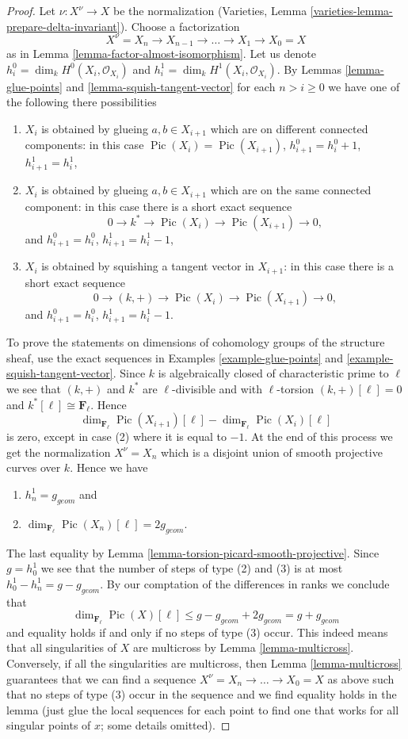 \documentclass[10pt,a4paper]{amsart}
\theoremstyle{plain}
\theoremstyle{definition}
\theoremstyle{remark}
\numberwithin{equation}{subsection}
\def\Pic{\mathop{\mathrm{Pic}}\nolimits}
\begin{document}
\begin{proof}
Let $\nu : X^\nu \to X$ be the normalization
(Varieties, Lemma \ref{varieties-lemma-prepare-delta-invariant}).
Choose a factorization
$$
X^\nu = X_n \to X_{n - 1} \to \ldots \to X_1 \to X_0 = X
$$
as in Lemma \ref{lemma-factor-almost-isomorphism}.
Let us denote $h^0_i = \dim_k H^0(X_i, \mathcal{O}_{X_i})$
and $h^1_i = \dim_k H^1(X_i, \mathcal{O}_{X_i})$.
By Lemmas \ref{lemma-glue-points} and \ref{lemma-squish-tangent-vector}
for each $n > i \geq 0$ we have
one of the following there possibilities
\begin{enumerate}
\item $X_i$ is obtained by glueing $a, b \in X_{i + 1}$
which are on different connected components: in this case
$\Pic(X_i) = \Pic(X_{i + 1})$,
$h^0_{i + 1} = h^0_i + 1$, $h^1_{i + 1} = h^1_i$,
\item $X_i$ is obtained by glueing $a, b \in X_{i + 1}$
which are on the same connected component: in this case
there is a short exact sequence
$$
0 \to k^* \to \Pic(X_i) \to \Pic(X_{i + 1}) \to 0,
$$
and $h^0_{i + 1} = h^0_i$, $h^1_{i + 1} = h^1_i - 1$,
\item $X_i$ is obtained by squishing a tangent vector in $X_{i + 1}$:
in this case there is a short exact sequence
$$
0 \to (k, +) \to \Pic(X_i) \to \Pic(X_{i + 1}) \to 0,
$$
and $h^0_{i + 1} = h^0_i$, $h^1_{i + 1} = h^1_i - 1$.
\end{enumerate}
To prove the statements on dimensions of cohomology groups of the
structure sheaf, use the exact sequences in
Examples \ref{example-glue-points} and \ref{example-squish-tangent-vector}.
Since $k$ is algebraically closed of characteristic prime to $\ell$
we see that $(k, +)$ and $k^*$ are $\ell$-divisible and with
$\ell$-torsion $(k, +)[\ell] = 0$ and $k^*[\ell] \cong \mathbf{F}_\ell$.
Hence
$$
\dim_{\mathbf{F}_\ell} \Pic(X_{i + 1})[\ell] -
\dim_{\mathbf{F}_\ell}\Pic(X_i)[\ell]
$$
is zero, except in case (2) where it is equal to $-1$.
At the end of this process we get the normalization
$X^\nu = X_n$ which is a disjoint union of smooth projective
curves over $k$. Hence we have
\begin{enumerate}
\item $h^1_n = g_{geom}$ and
\item $\dim_{\mathbf{F}_\ell} \Pic(X_n)[\ell] = 2g_{geom}$.
\end{enumerate}
The last equality by Lemma \ref{lemma-torsion-picard-smooth-projective}.
Since $g = h^1_0$ we see that the number of steps of type
(2) and (3) is at most $h^1_0 - h^1_n = g - g_{geom}$.
By our comptation of the differences in ranks we conclude that
$$
\dim_{\mathbf{F}_\ell} \Pic(X)[\ell] \leq
g - g_{geom} + 2g_{geom} = g + g_{geom}
$$
and equality holds if and only if no steps of type (3) occur.
This indeed means that all singularities of $X$ are multicross
by Lemma \ref{lemma-multicross}. Conversely, if all the singularities
are multicross, then Lemma \ref{lemma-multicross} guarantees that
we can find a sequence $X^\nu = X_n \to \ldots \to X_0 = X$
as above such that no steps of type (3) occur in the sequence
and we find equality holds in the lemma (just glue the local sequences
for each point to find one that works for all singular points of $x$;
some details omitted).
\end{proof}
\end{document}
